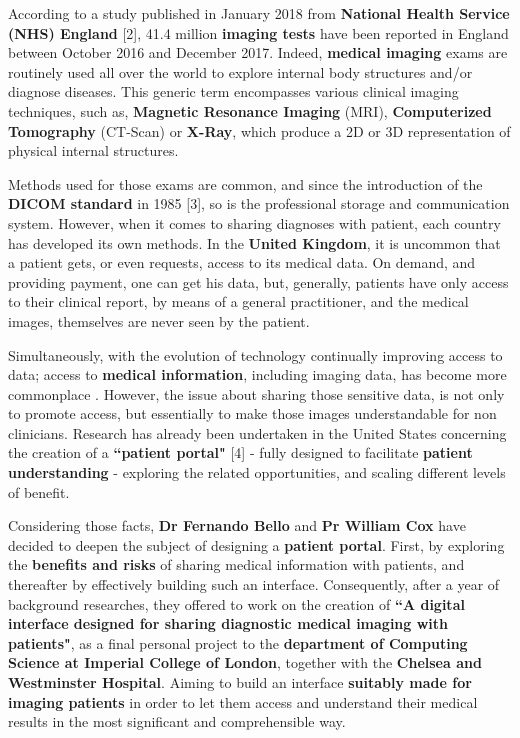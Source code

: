 According to a study published in January 2018 from \textbf{National Health Service (NHS) England} [2], 41.4 million \textbf{imaging tests} have been reported in England between October 2016 and December 2017. Indeed, \textbf{medical imaging} exams are routinely used all over the world to explore internal body structures and/or diagnose diseases. This generic term encompasses various clinical imaging techniques, such as, \textbf{Magnetic Resonance Imaging} (MRI), \textbf{Computerized Tomography} (CT-Scan) or \textbf{X-Ray}, which produce a 2D or 3D representation of physical internal structures. 

\newline \vspace{5mm}

Methods used for those exams are common, and since the introduction of the \textbf{DICOM standard} in 1985 [3], so is the professional storage and communication system. However, when it comes to sharing diagnoses with patient, each country has developed its own methods. In the \textbf{United Kingdom}, it is uncommon that a patient gets, or even requests, access to its medical data. On demand, and providing payment, one can get his data, but, generally, patients have only access to their clinical report, by means of a general practitioner, and the medical images, themselves are never seen by the patient. 

\newline \vspace{5mm}

Simultaneously, with the evolution of technology continually improving access to data; access to \textbf{medical information}, including imaging data, has become more commonplace . However, the issue about sharing those sensitive data, is not only to promote access, but essentially to make those images understandable for non clinicians. Research has already been undertaken in the United States concerning the creation of a \textbf{``patient portal"} [4] - fully designed to facilitate \textbf{patient understanding} - exploring the related opportunities, and scaling different levels of benefit. 

\newline \vspace{5mm}

Considering those facts, \textbf{Dr Fernando Bello} and \textbf{Pr William Cox} have decided to deepen the subject of designing a \textbf{patient portal}. First, by exploring the \textbf{benefits and risks} of sharing medical information with patients, and thereafter by effectively building such an interface. Consequently, after a year of background researches, they offered to work on the creation of \textbf{``A digital interface designed for sharing diagnostic medical imaging with patients"}, as a final personal project to the \textbf{department of Computing Science at Imperial College of London}, together with the \textbf{Chelsea and Westminster Hospital}. Aiming to build an interface \textbf{suitably made for imaging patients} in order to let them access and understand their medical results in the most significant and comprehensible way.

